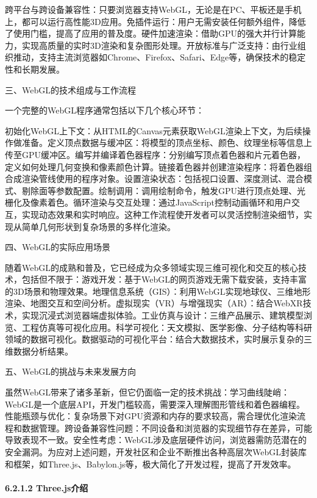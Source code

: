 跨平台与跨设备兼容性：只要浏览器支持WebGL，无论是在PC、平板还是手机上，都可以运行高性能3D应用。免插件运行：用户无需安装任何额外组件，降低了使用门槛，提高了应用的普及度。硬件加速渲染：借助GPU的强大并行计算能力，实现高质量的实时3D渲染和复杂图形处理。开放标准与广泛支持：由行业组织推动，支持主流浏览器如Chrome、Firefox、Safari、Edge等，确保技术的稳定性和长期发展。

三、WebGL的技术组成与工作流程

一个完整的WebGL程序通常包括以下几个核心环节：

初始化WebGL上下文：从HTML的Canvas元素获取WebGL渲染上下文，为后续操作做准备。定义顶点数据与缓冲区：将模型的顶点坐标、颜色、纹理坐标等信息上传至GPU缓冲区。编写并编译着色器程序：分别编写顶点着色器和片元着色器，定义如何处理几何变换和像素颜色计算。链接着色器并创建渲染程序：将着色器组合成渲染管线使用的程序对象。设置渲染状态：包括视口设置、深度测试、混合模式、剔除面等参数配置。绘制调用：调用绘制命令，触发GPU进行顶点处理、光栅化及像素着色。循环渲染与交互处理：通过JavaScript控制动画循环和用户交互，实现动态效果和实时响应。这种工作流程使开发者可以灵活控制渲染细节，实现从简单几何形状到复杂场景的多样化渲染。

四、WebGL的实际应用场景

随着WebGL的成熟和普及，它已经成为众多领域实现三维可视化和交互的核心技术，包括但不限于：游戏开发：基于WebGL的网页游戏无需下载安装，支持丰富的3D场景和物理效果。地理信息系统（GIS）：利用WebGL实现地球仪、三维地形渲染、地图交互和空间分析。虚拟现实（VR）与增强现实（AR）：结合WebXR技术，实现沉浸式浏览器端虚拟体验。工业仿真与设计：三维产品展示、建筑模型浏览、工程仿真等可视化应用。科学可视化：天文模拟、医学影像、分子结构等科研领域的数据可视化。数据驱动的可视化平台：结合大数据技术，实时展示复杂的三维数据分析结果。

五、WebGL的挑战与未来发展方向

虽然WebGL带来了诸多革新，但它仍面临一定的技术挑战：学习曲线陡峭：WebGL是一个底层API，开发门槛较高，需要深入理解图形管线和着色器编程。性能瓶颈与优化：复杂场景下对GPU资源和内存的要求较高，需合理优化渲染流程和数据管理。跨设备兼容性问题：不同设备和浏览器的实现细节存在差异，可能导致表现不一致。安全性考虑：WebGL涉及底层硬件访问，浏览器需防范潜在的安全漏洞。为应对上述问题，开发社区和企业不断推出各种高层次WebGL封装库和框架，如Three.js、Babylon.js等，极大简化了开发过程，提高了开发效率。

\hypertarget{three.jsux4ecbux7ecd}{%
\paragraph{6.2.1.2 Three.js介绍}\label{three.jsux4ecbux7ecd}}


